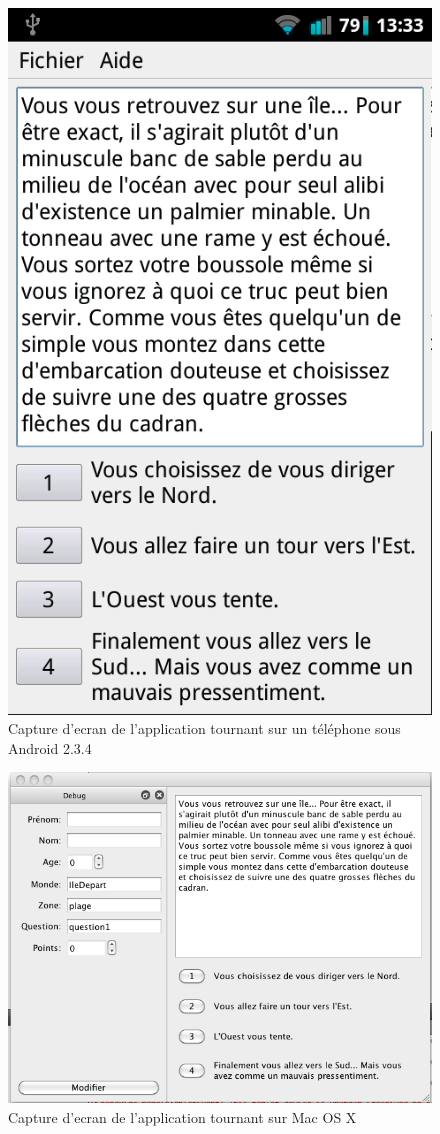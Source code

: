 \begin{figure}[p]
\centering
\includegraphics[scale=0.3]{figures/screenshots/androidWVGA}
\caption{Capture d'ecran de l'application tournant sur un téléphone sous Android 2.3.4}
\label{CaptureAndroid}
\end{figure}




\begin{figure}[p]
\centering
\includegraphics[scale=0.55]{figures/screenshots/OSX}
\caption{Capture d'ecran de l'application tournant sur Mac OS X}
\label{CaptureMac}
\end{figure}

\pagebreak